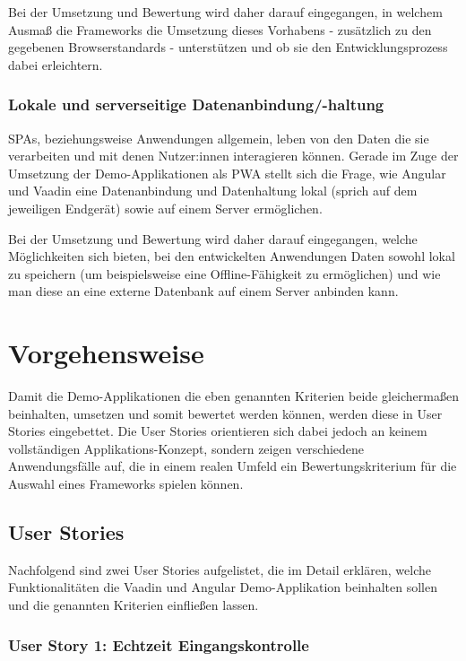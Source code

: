 \documentclass[a4paper,12pt,twoside]{scrreprt}
\begin{document}
Bei der Umsetzung und Bewertung wird daher darauf eingegangen, in welchem Ausmaß die Frameworks die Umsetzung dieses Vorhabens - zusätzlich zu den gegebenen Browserstandards - unterstützen und ob sie den Entwicklungsprozess dabei erleichtern.

\subsubsection*{Lokale und serverseitige Datenanbindung/-haltung}
\label{sub-sec:kriterien-datenanbindung}
\acp{SPA}, beziehungsweise Anwendungen allgemein, leben von den Daten die sie verarbeiten und mit denen Nutzer:innen interagieren können. Gerade im Zuge der Umsetzung der Demo-Applikationen als \ac{PWA} stellt sich die Frage, wie Angular und Vaadin eine Datenanbindung und Datenhaltung lokal (sprich auf dem jeweiligen Endgerät) sowie auf einem Server ermöglichen.

Bei der Umsetzung und Bewertung wird daher darauf eingegangen, welche Möglichkeiten sich bieten, bei den entwickelten Anwendungen Daten sowohl lokal zu speichern (um beispielsweise eine Offline-Fähigkeit zu ermöglichen) und wie man diese an eine externe Datenbank auf einem Server anbinden kann.

\section{Vorgehensweise}
\label{sec:vorgehensweise}
Damit die Demo-Applikationen die eben genannten Kriterien beide gleichermaßen beinhalten, umsetzen und somit bewertet werden können, werden diese in User Stories eingebettet. Die User Stories orientieren sich dabei jedoch an keinem vollständigen Applikations-Konzept, sondern zeigen verschiedene Anwendungsfälle auf, die in einem realen Umfeld ein Bewertungskriterium für die Auswahl eines Frameworks spielen können.

\subsection{User Stories}
\label{sub-sec:user-stories}
Nachfolgend sind zwei User Stories aufgelistet, die im Detail erklären, welche Funktionalitäten die Vaadin und Angular Demo-Applikation beinhalten sollen und die genannten Kriterien einfließen lassen.

\subsubsection*{User Story 1: Echtzeit Eingangskontrolle}
\label{sub-sub-sec:user-story-1}
\end{document}
